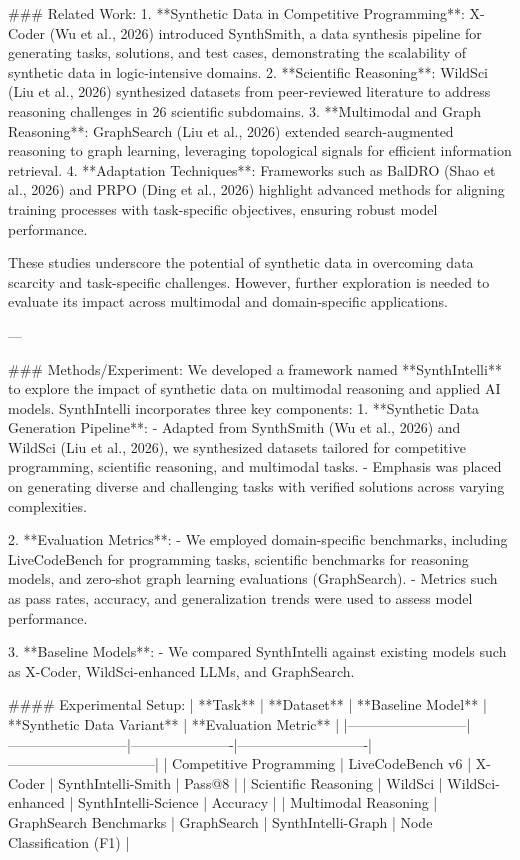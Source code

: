 ### Related Work:
1. **Synthetic Data in Competitive Programming**: X-Coder (Wu et al., 2026) introduced SynthSmith, a data synthesis pipeline for generating tasks, solutions, and test cases, demonstrating the scalability of synthetic data in logic-intensive domains.
2. **Scientific Reasoning**: WildSci (Liu et al., 2026) synthesized datasets from peer-reviewed literature to address reasoning challenges in 26 scientific subdomains.
3. **Multimodal and Graph Reasoning**: GraphSearch (Liu et al., 2026) extended search-augmented reasoning to graph learning, leveraging topological signals for efficient information retrieval.
4. **Adaptation Techniques**: Frameworks such as BalDRO (Shao et al., 2026) and PRPO (Ding et al., 2026) highlight advanced methods for aligning training processes with task-specific objectives, ensuring robust model performance.

These studies underscore the potential of synthetic data in overcoming data scarcity and task-specific challenges. However, further exploration is needed to evaluate its impact across multimodal and domain-specific applications.

---

### Methods/Experiment:
We developed a framework named **SynthIntelli** to explore the impact of synthetic data on multimodal reasoning and applied AI models. SynthIntelli incorporates three key components:
1. **Synthetic Data Generation Pipeline**:
   - Adapted from SynthSmith (Wu et al., 2026) and WildSci (Liu et al., 2026), we synthesized datasets tailored for competitive programming, scientific reasoning, and multimodal tasks.
   - Emphasis was placed on generating diverse and challenging tasks with verified solutions across varying complexities.

2. **Evaluation Metrics**:
   - We employed domain-specific benchmarks, including LiveCodeBench for programming tasks, scientific benchmarks for reasoning models, and zero-shot graph learning evaluations (GraphSearch).
   - Metrics such as pass rates, accuracy, and generalization trends were used to assess model performance.

3. **Baseline Models**:
   - We compared SynthIntelli against existing models such as X-Coder, WildSci-enhanced LLMs, and GraphSearch.

#### Experimental Setup:
| **Task**                | **Dataset**              | **Baseline Model**  | **Synthetic Data Variant** | **Evaluation Metric**         |
|--------------------------|--------------------------|----------------------|----------------------------|--------------------------------|
| Competitive Programming  | LiveCodeBench v6        | X-Coder             | SynthIntelli-Smith         | Pass@8                        |
| Scientific Reasoning     | WildSci                 | WildSci-enhanced    | SynthIntelli-Science       | Accuracy                      |
| Multimodal Reasoning     | GraphSearch Benchmarks  | GraphSearch         | SynthIntelli-Graph         | Node Classification (F1)      |

